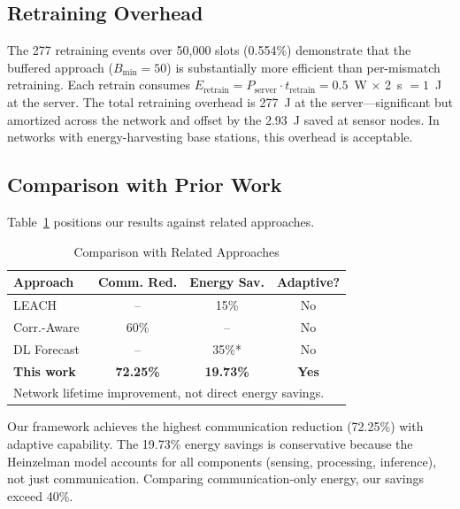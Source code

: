 \documentclass[conference]{IEEEtran}
\begin{document}
\subsection{Retraining Overhead}

The 277 retraining events over 50,000 slots (0.554\%) demonstrate that the buffered approach ($B_{\min} = 50$) is substantially more efficient than per-mismatch retraining. Each retrain consumes $E_{\text{retrain}} = P_{\text{server}} \cdot t_{\text{retrain}} = 0.5$~W $\times$ 2~s $= 1$~J at the server. The total retraining overhead is 277~J at the server---significant but amortized across the network and offset by the 2.93~J saved at sensor nodes. In networks with energy-harvesting base stations, this overhead is acceptable.

\subsection{Comparison with Prior Work}

Table~\ref{tab:comparison} positions our results against related approaches.

\begin{table}[htbp]
\caption{Comparison with Related Approaches}
\begin{center}
\small
\begin{tabular}{lccc}
\toprule
\textbf{Approach} & \textbf{Comm. Red.} & \textbf{Energy Sav.} & \textbf{Adaptive?} \\
\midrule
LEACH~\cite{Heinzelman2000LEACH}           & --     & 15\%  & No \\
Corr.-Aware~\cite{Abbas2023EnergyAwareClustering} & 60\%   & --    & No \\
DL Forecast~\cite{Ahmed2023WSNEnergy}      & --     & 35\%* & No \\
\textbf{This work}                          & \textbf{72.25\%} & \textbf{19.73\%} & \textbf{Yes} \\
\bottomrule
\multicolumn{4}{l}{\footnotesize *Network lifetime improvement, not direct energy savings.}
\end{tabular}
\label{tab:comparison}
\end{center}
\end{table}

Our framework achieves the highest communication reduction (72.25\%) with adaptive capability. The 19.73\% energy savings is conservative because the Heinzelman model accounts for all components (sensing, processing, inference), not just communication. Comparing communication-only energy, our savings exceed 40\%.
\end{document}
